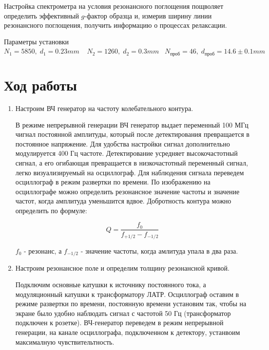 \documentclass[a4paper]{article}
\begin{document}
Настройка спектрометра на условия резонансного поглощения пощволяет определить эффективный $g$-фактор образца и, 
измерив ширину линии резонансного поглощения, получить информацию о процессах релаксации. \par 

Параметры установки $N_1 = 5850,\; d_1 = 0.23mm \;\;\;\; N_2 = 1260,\; d_2 = 0.3mm \;\;\; N_{проб} = 46, \; d_{проб} = 14.6 \pm 0.1 mm$

\section{Ход работы}

\begin{enumerate}
    \item
    Настроим ВЧ генератор на частоту колебательного контура. \par 
    В режиме непрерывной генерации ВЧ генератор 
    выдает переменный 100 МГц чигнал постоянной амплитуды, который после детектирования превращается в постоянное напряжение. 
    Для удобства настройки сигнал дополнительно модулируется 400 Гц частоте. Детектирование усредняет 
    высокочастотный сигнал, а его огибающая превращается в низкочастотный переменный сигнал, легко визуализируемый на 
    осциллограф. Для наблюдения сигнала переведем осциллограф в режим развертки по времени. По изображению на осциллографе можно определить 
    резонансное значение частоты и значение частот, когда амплитуда уменьшится вдвое. Добротность контура можно 
    определить по формуле:

    \begin{equation}
        Q = \frac{f_0}{f_{+1/2} - f_{-1/2}}
    \end{equation}

    $f_0$ - резонанс, а $f_{-1/2}$ - значение частоты, когда амлитуда упала в два раза.\par 


    \item
    Настроим резонансное поле и определим толщину резонансной кривой.\par 

    Подключим основные катушки к источнику постоянного тока, а модуляционный катушки к трансформатору ЛАТР.
    Осциллограф оставим в режиме развертки по времени, постоянную времени установим так, чтобы на экране было удобно 
    наблюдать сигнал с частотой 50 Гц (трансформатор подключен к розетке). ВЧ-генератор переведем в режим
    непрерывной генерации, на канале осциллографа, подключенном к детектору, устанвоим максималную чувствительтность. \par 


\end{enumerate}
\end{document}
